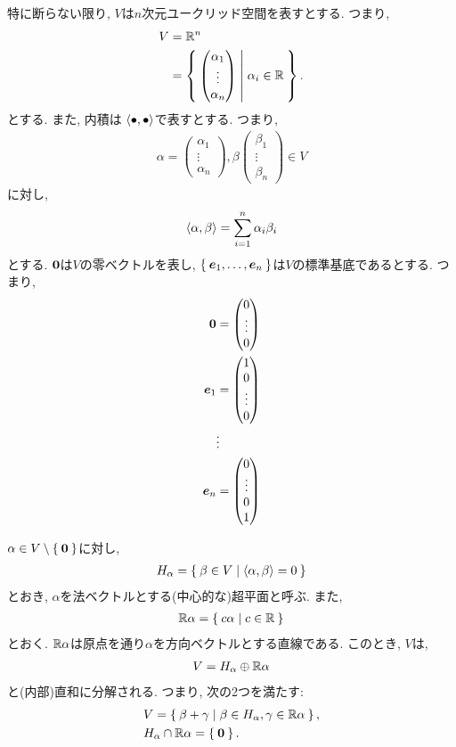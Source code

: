 特に断らない限り,
$V$は$n$次元ユークリッド空間を表すとする.
つまり,
\begin{align*}
  V&=\mathbb{R}^n\\
  &=\Set{\begin{pmatrix}\alpha_1\\\vdots\\\alpha_n\end{pmatrix} | \alpha_i \in \mathbb{R}}.
\end{align*}
とする. また, 内積は $\Braket{\bullet,\bullet}$で表すとする.
つまり,
\begin{align*}
\alpha=\begin{pmatrix}\alpha_1\\\vdots\\\alpha_n\end{pmatrix},\beta\begin{pmatrix}\beta_1\\\vdots\\\beta_n\end{pmatrix}\in V
\end{align*}
に対し,
\begin{align*}
\Braket{\alpha,\beta}=\sum_{i=1}^n \alpha_i \beta_i
\end{align*}
とする.
$\boldsymbol{0}$は$V$の零ベクトルを表し,
$\Set{\boldsymbol{e}_1,\ldots,\boldsymbol{e}_n}$は$V$の標準基底であるとする.
つまり,
\begin{align*}
 \boldsymbol{0}&=\begin{pmatrix}0\\\vdots\\0\end{pmatrix}\\
 \boldsymbol{e}_1&=\begin{pmatrix}1\\0\\\vdots\\0\end{pmatrix}\\
 &\vdots\\
 \boldsymbol{e}_n&=\begin{pmatrix}0\\\vdots\\0\\1\end{pmatrix}
\end{align*}


$\alpha \in V\setminus\Set{\boldsymbol{0}}$に対し,
\begin{align*}
  H_\alpha = \Set{\beta \in V | \Braket{\alpha,\beta}=0}
\end{align*}
とおき, $\alpha$を法ベクトルとする(中心的な)超平面と呼ぶ.
また,
\begin{align*}
  \mathbb{R}\alpha = \Set{c \alpha | c\in \mathbb{R}}
\end{align*}
とおく. $\mathbb{R}\alpha$は原点を通り$\alpha$を方向ベクトルとする直線である.
このとき, $V$は,
\begin{align*}
  V =   H_\alpha \oplus   \mathbb{R}\alpha
\end{align*}
と(内部)直和に分解される.  つまり, 次の2つを満たす:
\begin{align*}
  &V = \Set{ \beta + \gamma | \beta \in H_\alpha, \gamma \in \mathbb{R}\alpha},\\
  &H_\alpha \cap   \mathbb{R}\alpha =\Set{\boldsymbol{0}}.
\end{align*}

